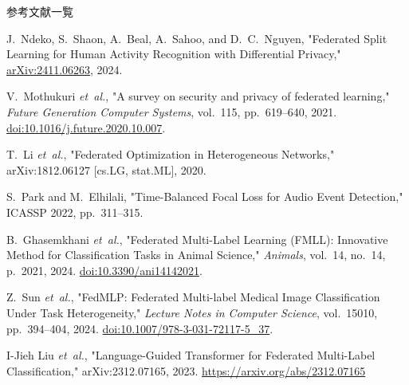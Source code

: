 \documentclass[unicode,12pt,aspectratio=169,dvipdfmx]{beamer}
\begin{document}
\begin{frame}[allowframebreaks]{参考文献一覧}
  \small
  \begin{thebibliography}{9}

  J.~Ndeko, S.~Shaon, A.~Beal, A.~Sahoo, and D.~C.~Nguyen, 
  "Federated Split Learning for Human Activity Recognition with Differential Privacy," 
  \href{https://arxiv.org/abs/2411.06263}{arXiv:2411.06263}, 2024.

  V.~Mothukuri \emph{et~al.},
  "A survey on security and privacy of federated learning," 
  \emph{Future Generation Computer Systems}, vol.~115, pp.~619–640, 2021. 
  \href{https://doi.org/10.1016/j.future.2020.10.007}{doi:10.1016/j.future.2020.10.007}.

  T.~Li \emph{et~al.}, 
  "Federated Optimization in Heterogeneous Networks," 
  arXiv:1812.06127 [cs.LG, stat.ML], 2020.

  S.~Park and M.~Elhilali, 
  "Time-Balanced Focal Loss for Audio Event Detection," ICASSP 2022, pp.~311–315.

  B.~Ghasemkhani \emph{et~al.},
  "Federated Multi-Label Learning (FMLL): Innovative Method for Classification Tasks in Animal Science,"
  \emph{Animals}, vol.~14, no.~14, p.~2021, 2024.
  \href{https://doi.org/10.3390/ani14142021}{doi:10.3390/ani14142021}.

  Z.~Sun \emph{et~al.},
  "FedMLP: Federated Multi-label Medical Image Classification Under Task Heterogeneity,"
  \emph{Lecture Notes in Computer Science}, vol.~15010, pp.~394–404, 2024.
  \href{https://doi.org/10.1007/978-3-031-72117-5_37}{doi:10.1007/978-3-031-72117-5\_37}.

  I-Jieh Liu \emph{et~al.}, 
  "Language-Guided Transformer for Federated Multi-Label Classification," 
  arXiv:2312.07165, 2023.
  \url{https://arxiv.org/abs/2312.07165}

  \end{thebibliography}
\end{frame}
\end{document}
